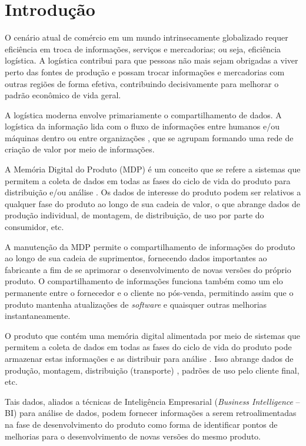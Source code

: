 \chapter{Introdução}
\label{cha:introducao}

	O cenário atual de comércio em um mundo intrinsecamente globalizado requer eficiência em troca de informações, serviços e mercadorias; ou seja, eficiência logística. A logística contribui para que pessoas não mais sejam obrigadas a viver perto das fontes de produção e possam trocar informações e mercadorias com outras regiões de forma efetiva, contribuindo decisivamente para melhorar o padrão econômico de vida geral. 
	
	A logística moderna envolve primariamente o compartilhamento de dados. A logística da informação lida com o fluxo de informações entre humanos e/ou máquinas dentro ou entre organizações \cite{haftor2009information}, que se agrupam formando uma rede de criação de valor por meio de informações. 
	
	A Memória Digital do Produto (MDP) é um conceito que se refere a sistemas que permitem a coleta de dados em todas as fases do ciclo de vida do produto para distribuição e/ou análise \cite{wahlster2007digitalmemory}. Os dados de interesse do produto podem ser relativos a qualquer fase do produto ao longo de sua cadeia de valor, o que abrange dados de produção individual, de montagem, de distribuição, de uso por parte do consumidor, etc.
	
	A manutenção da MDP permite o compartilhamento de informações do produto ao longo de sua cadeia de suprimentos, fornecendo dados importantes ao fabricante a fim de se aprimorar o desenvolvimento de novas versões do próprio produto. O compartilhamento de informações funciona também como um elo permanente entre o fornecedor e o cliente no pós-venda, permitindo assim que o produto mantenha atualizações de \textit{software} e quaisquer outras melhorias instantaneamente.
	
	O produto que contém uma memória digital alimentada por meio de sistemas que permitem a coleta de dados em todas as fases do ciclo de vida do produto pode armazenar estas informações e as distribuir para análise \cite{lasi2014industryfour}. Isso abrange dados de produção, montagem, distribuição (transporte) \cite{brandherm2011productmemory}, padrões de uso pelo cliente final, etc.
	
	Tais dados, aliados a técnicas de Inteligência Empresarial (\textit{Business Intelligence} -- BI) para análise de dados, podem fornecer informações a serem retroalimentadas na fase de desenvolvimento do produto como forma de identificar pontos de melhorias para o desenvolvimento de novas versões do mesmo produto.
	
